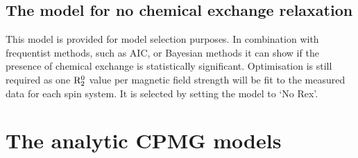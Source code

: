 
\subsection{The model for no chemical exchange relaxation}
\label{sect: dispersion: No Rex model}

This model is provided for model selection purposes.  In combination with frequentist methods, such as AIC, or Bayesian methods it can show if the presence of chemical exchange is statistically significant.  Optimisation is still required as one $\mathrm{R}_2^0$ value per magnetic field strength will be fit to the measured data for each spin system.  It is selected by setting the model to `No Rex'.




\section{The analytic CPMG models}
\label{sect: dispersion: analytical CPMG models}

